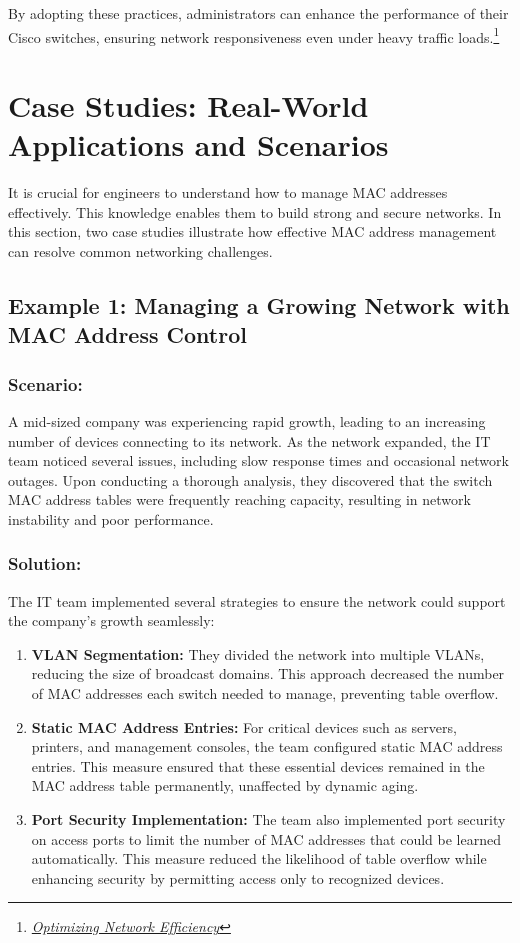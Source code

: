 \documentclass[11pt,a4paper]{article}
\begin{document}
    By adopting these practices, administrators can enhance the performance of their Cisco switches, ensuring network responsiveness even under heavy traffic loads.\footnote{\href{https://netseccloud.com/optimizing-network-efficiency-with-cisco-mac-address-table-settings}{\textit{Optimizing Network Efficiency}}}



\section*{Case Studies: Real-World Applications and Scenarios}

It is crucial for engineers to understand how to manage MAC addresses effectively. This knowledge enables them to build strong and secure networks. In this section, two case studies illustrate how effective MAC address management can resolve common networking challenges.

\subsection*{Example 1: Managing a Growing Network with MAC Address Control}

\subsubsection*{Scenario:}
A mid-sized company was experiencing rapid growth, leading to an increasing number of devices connecting to its network. As the network expanded, the IT team noticed several issues, including slow response times and occasional network outages. Upon conducting a thorough analysis, they discovered that the switch MAC address tables were frequently reaching capacity, resulting in network instability and poor performance.


\subsubsection*{Solution:}
The IT team implemented several strategies to ensure the network could support the company’s growth seamlessly:

\begin{enumerate}
    \item \textbf{VLAN Segmentation:} They divided the network into multiple VLANs, reducing the size of broadcast domains. This approach decreased the number of MAC addresses each switch needed to manage, preventing table overflow.
    \item \textbf{Static MAC Address Entries:} For critical devices such as servers, printers, and management consoles, the team configured static MAC address entries. This measure ensured that these essential devices remained in the MAC address table permanently, unaffected by dynamic aging.
    \item \textbf{Port Security Implementation:} The team also implemented port security on access ports to limit the number of MAC addresses that could be learned automatically. This measure reduced the likelihood of table overflow while enhancing security by permitting access only to recognized devices.
\end{enumerate}
\end{document}
